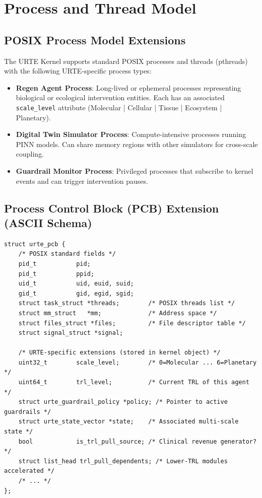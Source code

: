\documentclass[11pt,a4paper]{report}
\begin{document}
\chapter{Process and Thread Model}

\section{POSIX Process Model Extensions}

The URTE Kernel supports standard POSIX processes and threads (pthreads) with the following URTE-specific process types:

\begin{itemize}
    \item \textbf{Regen Agent Process}: Long-lived or ephemeral processes representing biological or ecological intervention entities. Each has an associated \texttt{scale\_level} attribute (Molecular | Cellular | Tissue | Ecosystem | Planetary).
    \item \textbf{Digital Twin Simulator Process}: Compute-intensive processes running PINN models. Can share memory regions with other simulators for cross-scale coupling.
    \item \textbf{Guardrail Monitor Process}: Privileged processes that subscribe to kernel events and can trigger intervention pauses.
\end{itemize}

\section{Process Control Block (PCB) Extension (ASCII Schema)}

\begin{lstlisting}[style=kernelschema, caption={Extended Process Control Block (PCB) for URTE}]
struct urte_pcb {
    /* POSIX standard fields */
    pid_t           pid;
    pid_t           ppid;
    uid_t           uid, euid, suid;
    gid_t           gid, egid, sgid;
    struct task_struct *threads;        /* POSIX threads list */
    struct mm_struct   *mm;             /* Address space */
    struct files_struct *files;         /* File descriptor table */
    struct signal_struct *signal;

    /* URTE-specific extensions (stored in kernel object) */
    uint32_t        scale_level;        /* 0=Molecular ... 6=Planetary */
    uint64_t        trl_level;          /* Current TRL of this agent */
    struct urte_guardrail_policy *policy; /* Pointer to active guardrails */
    struct urte_state_vector *state;    /* Associated multi-scale state */
    bool            is_trl_pull_source; /* Clinical revenue generator? */
    struct list_head trl_pull_dependents; /* Lower-TRL modules accelerated */
    /* ... */
};
\end{lstlisting}
\end{document}
